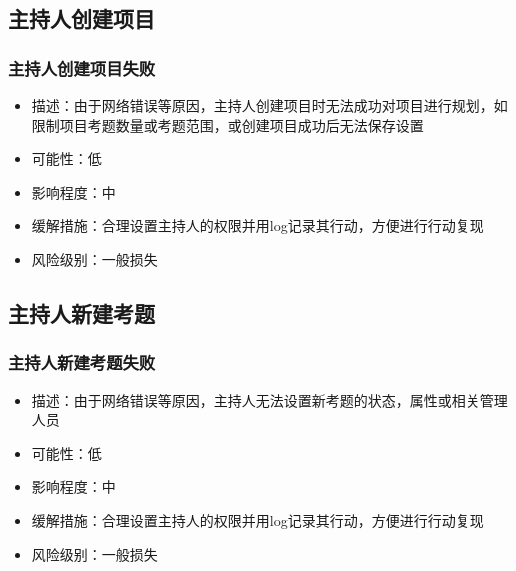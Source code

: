 \documentclass[hyperref, a4paper]{ctexart}
\providecommand{\tightlist}{%
  \setlength{\itemsep}{0pt}\setlength{\parskip}{0pt}}
\begin{document}
\hypertarget{ux4e3bux6301ux4ebaux521bux5efaux9879ux76ee-1}{%
\subsection{主持人创建项目}\label{ux4e3bux6301ux4ebaux521bux5efaux9879ux76ee-1}}

\hypertarget{ux4e3bux6301ux4ebaux521bux5efaux9879ux76eeux5931ux8d25}{%
\subsubsection{主持人创建项目失败}\label{ux4e3bux6301ux4ebaux521bux5efaux9879ux76eeux5931ux8d25}}

\begin{itemize}
\tightlist
\item
  描述：由于网络错误等原因，主持人创建项目时无法成功对项目进行规划，如限制项目考题数量或考题范围，或创建项目成功后无法保存设置
\item
  可能性：低
\item
  影响程度：中
\item
  缓解措施：合理设置主持人的权限并用log记录其行动，方便进行行动复现
\item
  风险级别：一般损失
\end{itemize}

\hypertarget{ux4e3bux6301ux4ebaux65b0ux5efaux8003ux9898-1}{%
\subsection{主持人新建考题}\label{ux4e3bux6301ux4ebaux65b0ux5efaux8003ux9898-1}}

\hypertarget{ux4e3bux6301ux4ebaux65b0ux5efaux8003ux9898ux5931ux8d25}{%
\subsubsection{主持人新建考题失败}\label{ux4e3bux6301ux4ebaux65b0ux5efaux8003ux9898ux5931ux8d25}}

\begin{itemize}
\tightlist
\item
  描述：由于网络错误等原因，主持人无法设置新考题的状态，属性或相关管理人员
\item
  可能性：低
\item
  影响程度：中
\item
  缓解措施：合理设置主持人的权限并用log记录其行动，方便进行行动复现
\item
  风险级别：一般损失
\end{itemize}
\end{document}
